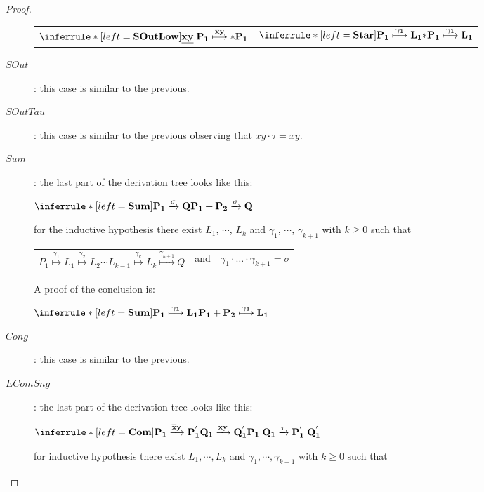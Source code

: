 \begin{proposition}
\begin{proof}
\begin{description}
\begin{center}
\begin{tabular}{ll}
		$\inferrule* [left=\bf{SOutLow}]{
 		}{
 		  \underline{\overline{x}y}.P_{1} \stackrel{\overline{x}y}{\longmapsto} *P_{1}
 		}$
	      &
		$\inferrule* [left=\bf{Star}]{
 		  P_{1} \stackrel{\gamma_{1}}{\longmapsto} L_{1}
 		}{
 		  *P_{1} \stackrel{\gamma_{1}}{\longmapsto} L_{1}
 		}$
	      \end{tabular}
	    \end{center}
      \item[$SOut$]: this case is similar to the previous.
      \item[$SOutTau$]: this case is similar to the previous observing that $\overline{x}y \cdot \tau = \overline{x}y$.
      \item[$Sum$]: 
	the last part of the derivation tree looks like this:
	\begin{center}
	  $\inferrule* [left=\bf{Sum}]{
	    P_{1} \xrightarrow{\sigma} Q
	  }{
	    P_{1}+P_{2} \xrightarrow{\sigma} Q
	  }$
	\end{center}
	for the inductive hypothesis there exist $L_{1}$, $\cdots$, $L_{k}$ and $\gamma_{1}$, $\cdots$, $\gamma_{k+1}$ with $k\geq 0$ such that 
	\begin{center}
	  \begin{tabular}{lll}
	    $P_{1} \stackrel{\gamma_{1}}{\longmapsto} L_{1}  \stackrel{\gamma_{2}}{\longmapsto} L_{2} \cdots L_{k-1} \stackrel{\gamma_{k}}{\longmapsto} L_{k} \stackrel{\gamma_{k+1}}{\longmapsto} Q$ 
	  &
	    and
	  &
	    $\gamma_{1} \cdot \ldots \cdot \gamma_{k+1} =  \sigma$  
	  \end{tabular}
	\end{center}
	A proof of the conclusion is:
	\begin{center}
	  $\inferrule* [left=\bf{Sum}]{
	      P_{1} \stackrel{\gamma_{1}}{\longmapsto} L_{1}
	    }{
	      P_{1}+P_{2} \stackrel{\gamma_{1}}{\longmapsto} L_{1}
	    }
	  $
	\end{center}
      \item[$Cong$]: this case is similar to the previous.
      \item[$EComSng$]: 
	the last part of the derivation tree looks like this:
	\begin{center}
	  $\inferrule* [left=\bf{Com}]{
	      P_{1} \xrightarrow{\overline{x}y} P_{1}^{'}
	    \\
	      Q_{1} \xrightarrow{xy} Q_{1}^{'}
	  }{
	    P_{1}|Q_{1} \xrightarrow{\tau} P_{1}^{'}|Q_{1}^{'}
	  }$
	\end{center}
	for inductive hypothesis there exist $L_{1}, \cdots, L_{k}$ and $\gamma_{1}, \cdots, \gamma_{k+1}$ with $k\geq 0$ such that 

\end{description}
\end{proof}
\end{proposition}
